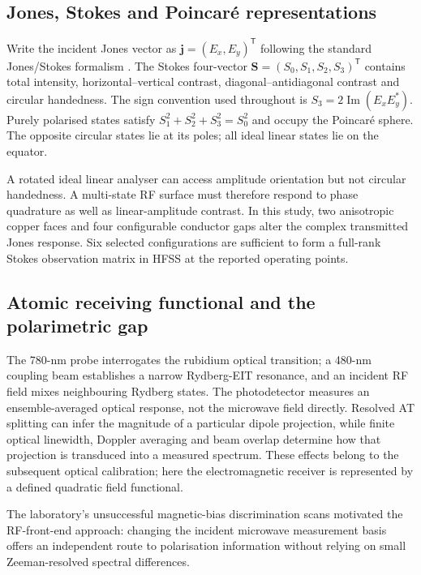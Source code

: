 \documentclass{ieeeaccess}
\begin{document}
\subsection{Jones, Stokes and Poincar\'e representations}
Write the incident Jones vector as $\boldsymbol j=(E_x,E_y)^{\mathsf T}$ following the standard Jones/Stokes formalism \cite{Jones1941,BornWolf1999,Goldstein2011}. The Stokes four-vector $\boldsymbol S=(S_0,S_1,S_2,S_3)^{\mathsf T}$ contains total intensity, horizontal--vertical contrast, diagonal--antidiagonal contrast and circular handedness. The sign convention used throughout is $S_3=2\operatorname{Im}(E_xE_y^*)$. Purely polarised states satisfy $S_1^2+S_2^2+S_3^2=S_0^2$ and occupy the Poincar\'e sphere. The opposite circular states lie at its poles; all ideal linear states lie on the equator.

A rotated ideal linear analyser can access amplitude orientation but not circular handedness. A multi-state RF surface must therefore respond to phase quadrature as well as linear-amplitude contrast. In this study, two anisotropic copper faces and four configurable conductor gaps alter the complex transmitted Jones response. Six selected configurations are sufficient to form a full-rank Stokes observation matrix in HFSS at the reported operating points.

\subsection{Atomic receiving functional and the polarimetric gap}
The 780-nm probe interrogates the rubidium optical transition; a 480-nm coupling beam establishes a narrow Rydberg-EIT resonance, and an incident RF field mixes neighbouring Rydberg states. The photodetector measures an ensemble-averaged optical response, not the microwave field directly. Resolved AT splitting can infer the magnitude of a particular dipole projection, while finite optical linewidth, Doppler averaging and beam overlap determine how that projection is transduced into a measured spectrum. These effects belong to the subsequent optical calibration; here the electromagnetic receiver is represented by a defined quadratic field functional.

The laboratory's unsuccessful magnetic-bias discrimination scans motivated the RF-front-end approach: changing the incident microwave measurement basis offers an independent route to polarisation information without relying on small Zeeman-resolved spectral differences.
\end{document}
